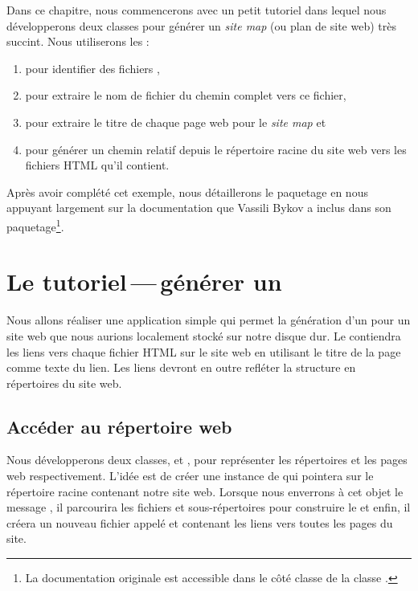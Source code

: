 \documentclass[a4paper,10pt,twoside]{book}
\begin{document}
Dans ce chapitre, nous commencerons avec un petit tutoriel dans lequel
nous développerons deux classes pour générer un \emph{site map} (ou
plan de site web) très succint.
Nous utiliserons les \expregs:
\begin{enumerate}
\item pour identifier des fichiers ,
\item pour extraire
le nom de fichier du chemin complet vers ce fichier, 
\item pour extraire le titre de chaque page web pour le \emph{site
    map} et
\item pour générer un chemin relatif depuis le répertoire racine du
  site web vers les fichiers HTML qu'il contient.
\end{enumerate}
Après avoir complété cet exemple, nous détaillerons le paquetage
\pkgregex en nous appuyant largement sur la documentation que Vassili
Bykov a inclus dans son paquetage\footnote{La documentation originale
  est accessible dans le côté classe de la classe .}.

\section{Le tutoriel\,---\,générer un \sitemap}


Nous allons réaliser une application simple qui permet la génération
d'un \sitemap pour un site web que nous aurions localement stocké sur
notre disque dur. Le \sitemap contiendra les liens vers chaque fichier
HTML sur le site web en utilisant le titre de la page comme texte du
lien. Les liens devront en outre refléter la structure en répertoires
du site web.

\subsection{Accéder au répertoire web}


Nous développerons deux classes,  et , pour
représenter les répertoires et les pages web respectivement. L'idée
est de créer une instance de  qui pointera sur le
répertoire racine contenant notre site web. Lorsque nous enverrons à
cet objet le message , il parcourira les fichiers et
sous-répertoires pour construire le \sitemap et enfin, il créera un
nouveau fichier appelé  et contenant les liens vers
toutes les pages du site.
\end{document}
